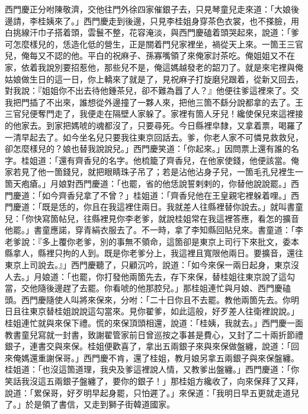 西門慶正分咐陳敬濟，交他往門外徐四家催銀子去，只見琴童兒走來道：「大娘後邊請，李桂姨來了。」西門慶走到後邊，只見李桂姐身穿茶色衣裳，也不搽臉，用白挑線汗巾子搭着頭，雲鬟不整，花容淹淡，與西門慶磕着頭哭起來，說道：「爹可怎麼樣兒的，恁造化低的營生，正是關着門兒家裡坐，禍從天上來。一箇王三官兒，俺每又不認的他。平白的祝麻子、孫寡嘴領了來俺家討茶吃。俺姐姐又不在家，依着我說別要招惹他，那些兒不是，{}俺這媽越發老的韶刀了。就是來宅裡與俺姑娘做生日的這一日，你上轎來了就是了，見祝麻子打旋磨兒跟着，從新又回去，對我說：『姐姐你不出去待他鍾茶兒，卻不難為囂了人？』他便往爹這裡來了。交我把門插了不出來，誰想從外邊撞了一夥人來，把他三箇不繇分說都拿的去了。王三官兒便奪門走了，我便走在隔壁人家躲了。家裡有箇人牙兒！纔使保兒來這裡接的他家去。到家把媽唬的魂都沒了，只要尋死。今日縣裡皁隸，又拿着票，喝羅了一清早起去了。如今坐名兒只要我往東京回話去。爹，你老人家不可憐見救救兒，卻怎麼樣兒的？娘也替我說說兒。」{}西門慶笑道：「你起來。」因問票上還有誰的名字。桂姐道：「還有齊香兒的名字。他梳籠了齊香兒，在他家使錢，他便該當。{}俺家若見了他一箇錢兒，就把眼睛珠子吊了；若是沾他沾身子兒，一箇毛孔兒裡生一箇天疱瘡。」月娘對西門慶道：「也罷，省的他恁說誓剌剌的，你替他說說罷。」西門慶道：「如今齊香兒拿了不曾？」桂姐道：「齊香兒他在王皇親宅裡躲着哩。」西門慶道：「既是恁的，你且在我這裡住兩日。我就差人往縣裡替你說去。」就叫書童兒：「你快寫箇帖兒，往縣裡見你李老爹，就說桂姐常在我這裡答應，看怎的擴音他罷。」書童應諾，穿青絹衣服去了。不一時，拿了李知縣回貼兒來。書童道：「李老爹說：『多上覆你老爹，別的事無不領命，這箇卻是東京上司行下來批文，委本縣拿人，縣裡只拘的人到。既是你老爹分上，我這裡且寬限他兩日。要擴音，還往東京上司說去。』」西門慶聽了，只顧沉吟，說道：「如今來保一兩日起身，東京沒人去。」月娘道：「也罷，你打發他兩箇先去，存下來保，替桂姐往東京說了這勾當，交他隨後邊趕了去罷。你看唬的他那腔兒。」那桂姐連忙與月娘、西門慶磕頭。{}西門慶隨使人叫將來保來，分咐：「二十日你且不去罷。教他兩箇先去。你明日且往東京替桂姐說說這勾當來。見你翟爹，如此這般，好歹差人往衛裡說說。」桂姐連忙就與來保下禮。慌的來保頂頭相還，說道：「桂姨，我就去。」{}西門慶一面教書童兒寫就一封書，致謝翟管家前日曾巡按之事甚是費心，又封了二十兩折節禮銀子，連書交與來保。桂姐便歡喜了，拿出五兩銀子來與來保做盤纏，說道：「回來俺媽還重謝保哥。」西門慶不肯，還了桂姐，教月娘另拿五兩銀子與來保盤纏。桂姐道：「也沒這箇道理，我央及爹這裡說人情，又教爹出盤纏。」西門慶道：「你笑話我沒這五兩銀子盤纏了，要你的銀子！」{}那桂姐方纔收了，向來保拜了又拜，說道：「累保哥，好歹明早起身罷，只怕遲了。」來保道：「我明日早五更就走道兒了。」於是領了書信，又走到獅子街韓道國家。

